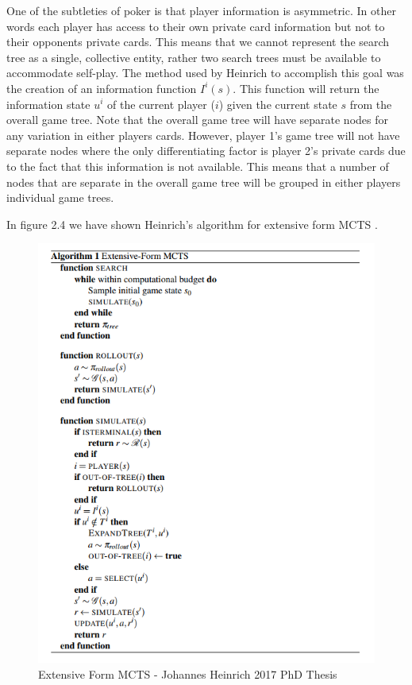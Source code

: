 One of the subtleties of poker is that player information is asymmetric.
In other words each player has access to their own private card 
information but not to their opponents private cards.
This means that we cannot represent the search tree as a single, collective 
entity\citep{heinrich2017reinforcement}, rather two search trees must be available 
to accommodate self-play.
The method used by Heinrich to accomplish this goal was the creation of 
an information function $I^i(s)$.
This function will return the information state $u^i$ of the current player ($i$) given
the current state $s$ from the overall game tree.
Note that the overall game tree will have separate nodes for any variation 
in either players cards.
However, player 1's game tree will not have separate nodes where the only 
differentiating factor is player 2's private cards\citep{johanson2011accelerating} 
due to the fact that this information is not available.
This means that a number of nodes that are separate in the overall game tree will 
be grouped in either players individual game trees.

In figure 2.4 we have shown Heinrich's algorithm for extensive form MCTS .

\begin{figure}[!ht]
    \includegraphics[scale=.6]{images/extensive_form_mcts.png}
    \caption{Extensive Form MCTS - Johannes Heinrich 2017 PhD Thesis}
\end{figure}

